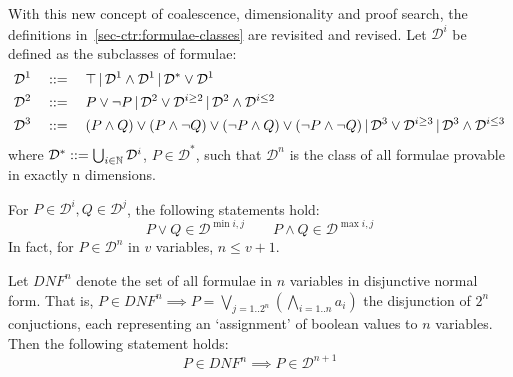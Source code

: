     \begin{definition*}
        With this new concept of coalescence, dimensionality and proof search, the definitions in~\ref{sec-ctr:formulae-classes} are revisited and revised.
        Let $\mathcal{D}^i$ be defined as the subclasses of formulae:
        \begin{align*}
            \mathcal{D}^1 \quad &::= \quad \top \,|\, \mathcal{D}^1 \wedge \mathcal{D}^1 \,|\, \mathcal{D}^* \vee \mathcal{D}^1 \\
            \mathcal{D}^2 \quad &::= \quad P \vee \neg P \,|\, \mathcal{D}^2 \vee \mathcal{D}^{i \geq 2} \,|\, \mathcal{D}^2 \wedge \mathcal{D}^{i \leq 2} \\
            \mathcal{D}^3 \quad &::= \quad (P \wedge Q) \vee (P \wedge \neg Q) \vee (\neg P \wedge Q) \vee (\neg P \wedge \neg Q) \,|\, \mathcal{D}^3 \vee \mathcal{D}^{i \geq 3} \,|\, \mathcal{D}^3 \wedge \mathcal{D}^{i \leq 3}
        \end{align*}
        where $\mathcal{D}^* ::= \bigcup_{i \in \mathbb{N}} \mathcal{D}^i$, $P \in \mathcal{D}^*$, such that $\mathcal{D}^n$ is the class of all formulae provable in exactly n dimensions.
    \end{definition*}
    
    \begin{corollary}\label{cory:dimensionality-algebra}
        For $P \in \mathcal{D}^i, Q \in \mathcal{D}^j$, the following statements hold:
        \begin{equation*}
            P \vee Q \in \mathcal{D}^{\min{i, j}}
            \qquad
            P \wedge Q \in \mathcal{D}^{\max{i, j}}
        \end{equation*}
        In fact, for $P \in \mathcal{D}^n$ in $v$ variables, $n \leq v + 1$.
    \end{corollary}


    \begin{proposition}\label{propn:dimensionality-bounds}
        Let $\textit{DNF}^n$ denote the set of all formulae in $n$ variables in disjunctive normal form.
        That is, $P \in \textit{DNF}^n \implies P = \bigvee_{j = 1 .. 2^n} (\bigwedge_{i = 1 .. n} a_i)$ the disjunction of $2^n$ conjuctions, each representing an `assignment' of boolean values to $n$ variables.
        Then the following statement holds:
        \begin{equation*}
            P \in \textit{DNF}^n \implies P \in \mathcal{D}^{n+1}
        \end{equation*}
    \end{proposition}

